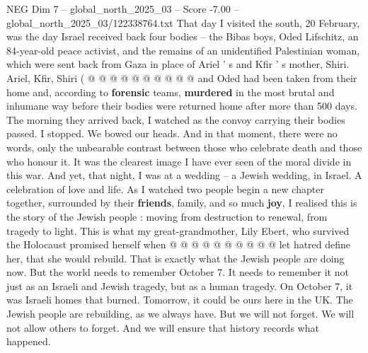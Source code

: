 \begin{textsample}{NEG Dim 7 – global\_north\_2025\_03 – Score -7.00 – global\_north\_2025\_03/122338764.txt}
That day I visited the south, 20 February, was the day Israel received back four bodies -- the Bibas boys, Oded Lifschitz, an 84-year-old peace activist, and the remains of an unidentified Palestinian woman, which were sent back from Gaza in place of Ariel ' s and Kfir ' s mother, Shiri.
Ariel, Kfir, Shiri ( @ @ @ @ @ @ @ @ @ @ and Oded had been taken from their home and, according to \textbf{forensic} teams, \textbf{murdered} in the most brutal and inhumane way before their bodies were returned home after more than 500 days.
The morning they arrived back, I watched as the convoy carrying their bodies passed.
I stopped.
We bowed our heads.
And in that moment, there were no words, only the unbearable contrast between those who celebrate death and those who honour it.
It was the clearest image I have ever seen of the moral divide in this war.
And yet, that night, I was at a wedding -- a Jewish wedding, in Israel.
A celebration of love and life.
As I watched two people begin a new chapter together, surrounded by their \textbf{friends}, family, and so much \textbf{joy}, I realised this is the story of the Jewish people : moving from destruction to renewal, from tragedy to light.
This is what my great-grandmother, Lily Ebert, who survived the Holocaust promised herself when @ @ @ @ @ @ @ @ @ @ let hatred define her, that she would rebuild.
That is exactly what the Jewish people are doing now.
But the world needs to remember October 7.
It needs to remember it not just as an Israeli and Jewish tragedy, but as a human tragedy.
On October 7, it was Israeli homes that burned.
Tomorrow, it could be ours here in the UK.
The Jewish people are rebuilding, as we always have.
But we will not forget.
We will not allow others to forget.
And we will ensure that history records what happened.

\end{textsample}
